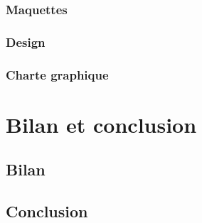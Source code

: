 \documentclass[french]{report}
\begin{document}
\subsection{Maquettes}
\label{partie_maquettes}

\subsection{Design}
\label{partie_design}

\subsection{Charte graphique}
\label{partie_charte_graphique}



\chapter{Bilan et conclusion}
\section{Bilan}
\label{partie_bilan}

\section{Conclusion}
\label{partie_conclusion}



\appendix 

\end{document}
